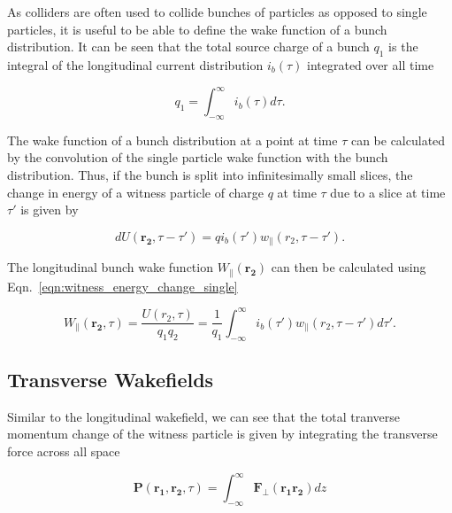 As colliders are often used to collide bunches of particles as opposed to single particles, it is useful to be able to define the wake function of a bunch distribution. It can be seen that the total source charge of a bunch $q_{1}$ is the integral of the longitudinal current distribution $i_{b}\left( \tau \right)$ integrated over all time

\begin{equation}
q_{1} = \int^{\infty}_{-\infty}i_{b}\left( \tau \right) d\tau{}.
\end{equation}

The wake function of a bunch distribution at a point at time $\tau$ can be calculated by the convolution of the single particle wake function with the bunch distribution. Thus, if the bunch is split into infinitesimally small slices, the change in energy of a witness particle of charge $q$ at time $\tau$ due to a slice at time $\tau{}'$ is given by

\begin{equation}
dU\left(\mathbf{r_{2}}, \tau-\tau{}'  \right) = q i_{b}\left( \tau{}' \right) w_{\parallel}\left( r_{2}, \tau{}-\tau{}' \right).
\end{equation}

The longitudinal bunch wake function $W_{\parallel}\left(\mathbf{r_{2}}\right)$ can then be calculated using Eqn.~\ref{eqn:witness_energy_change_single}

\begin{equation}
W_{\parallel}\left( \mathbf{r_{2}}, \tau \right) = \frac{U\left( r_{2}, \tau \right) }{q_{1} q_{2}} = \frac{1}{q_{1}}\int^{\infty}_{-\infty}i_{b}\left( \tau{}' \right) w_{\parallel}\left( r_{2}, \tau{}-\tau{}'\right) d\tau{}' .
\end{equation}

\subsection{Transverse Wakefields}

Similar to the longitudinal wakefield, we can see that the total tranverse momentum change of the witness particle is given by integrating the transverse force across all space

\begin{equation}
\mathbf{P}\left(\mathbf{r_{1}}, \mathbf{r_{2}}, \tau  \right) = \int^{\infty}_{-\infty} \mathbf{F_{\perp}} \left( \mathbf{r_{1}} \mathbf{r_{2}}\right) dz
\end{equation}

